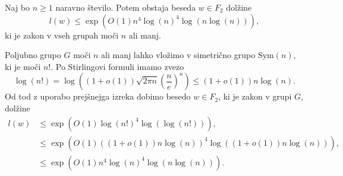 
\begin{posledica}\label{psl_zakon_v_splosni_grupi}
    Naj bo $n \ge 1$ naravno število. Potem obstaja beseda $w \in F_2$ dolžine \begin{equation*}
        l(w) \le \exp{\left( O(1) n^4 \log(n)^4 \log(n \log(n)) \right)},
    \end{equation*}
    ki je zakon v vseh grupah moči $n$ ali manj.
\end{posledica}
\begin{dokaz}
    Poljubno grupo $G$ moči $n$ ali manj lahko vložimo v simetrično grupo $\text{Sym}(n)$, ki je moči $n!$. Po Stirlingovi formuli imamo zvezo \begin{equation*}
       \log(n!) = \log \left( (1+ o(1)) \sqrt{2 \pi n} \left( \frac{n}{e} \right)^n   \right) \le (1 + o(1)) n \log(n).
    \end{equation*}
    Od tod z uporabo prejšnejga izreka dobimo besedo $w \in F_2$, ki je zakon v grupi $G$, dolžine \begin{align*}
        l(w) &\le  \exp{\left(O(1) \log(n!)^4 \log(\log(n!))\right)}, \\
            &\le \exp{\left(O(1) ((1 + o(1)) n \log(n))^4 \log((1 + o(1)) n \log(n))\right)}, \\
            &\le \exp{\left( O(1) n^4 \log(n)^4 \log(n \log(n)) \right)}.
    \end{align*}\end{dokaz}


